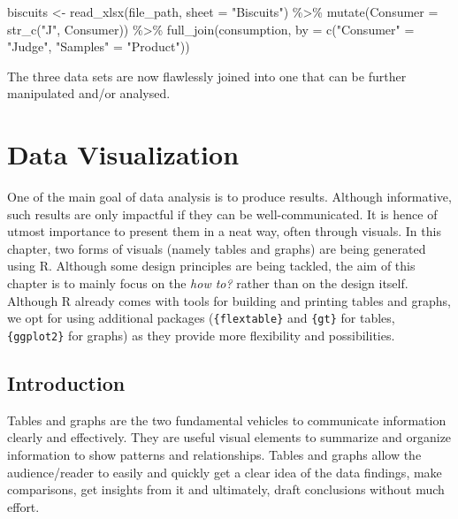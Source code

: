 \documentclass[
]{krantz}
\makeatletter
\newenvironment{Shaded}{\begin{snugshade}}{\end{snugshade}}
\newcommand{\AttributeTok}[1]{\textcolor[rgb]{0.61,0.61,0.61}{#1}}
\newcommand{\FunctionTok}[1]{\textcolor[rgb]{0,0,0}{#1}}
\newcommand{\NormalTok}[1]{#1}
\newcommand{\OtherTok}[1]{\textcolor[rgb]{0.37,0.37,0.37}{#1}}
\newcommand{\SpecialCharTok}[1]{\textcolor[rgb]{0,0,0}{#1}}
\newcommand{\StringTok}[1]{\textcolor[rgb]{0.5,0.5,0.5}{#1}}
\renewenvironment{quote}{\begin{VF}}{\end{VF}}
\newenvironment{kframe}{%
\medskip{}
\setlength{\fboxsep}{.8em}
 \def\at@end@of@kframe{}%
 \ifinner\ifhmode%
  \def\at@end@of@kframe{\end{minipage}}%
  \begin{minipage}{\columnwidth}%
 \fi\fi%
 \def\FrameCommand##1{\hskip\@totalleftmargin \hskip-\fboxsep
 \colorbox{shadecolor}{##1}\hskip-\fboxsep
     \hskip-\linewidth \hskip-\@totalleftmargin \hskip\columnwidth}%
 \MakeFramed {\advance\hsize-\width
   \@totalleftmargin\z@ \linewidth\hsize
   \@setminipage}}%
 {\par\unskip\endMakeFramed%
 \at@end@of@kframe}
\renewenvironment{Shaded}{\begin{kframe}}{\end{kframe}}
\makeatother
\begin{document}
\begin{Shaded}
\begin{Highlighting}[]
\NormalTok{biscuits }\OtherTok{\textless{}{-}} \FunctionTok{read\_xlsx}\NormalTok{(file\_path, }\AttributeTok{sheet =} \StringTok{"Biscuits"}\NormalTok{) }\SpecialCharTok{\%\textgreater{}\%}
   \FunctionTok{mutate}\NormalTok{(}\AttributeTok{Consumer =} \FunctionTok{str\_c}\NormalTok{(}\StringTok{"J"}\NormalTok{, Consumer)) }\SpecialCharTok{\%\textgreater{}\%}
   \FunctionTok{full\_join}\NormalTok{(consumption, }
             \AttributeTok{by =} \FunctionTok{c}\NormalTok{(}\StringTok{"Consumer"} \OtherTok{=} \StringTok{"Judge"}\NormalTok{, }\StringTok{"Samples"} \OtherTok{=} \StringTok{"Product"}\NormalTok{))}
\end{Highlighting}
\end{Shaded}

The three data sets are now flawlessly joined into one that can be further manipulated and/or analysed.

\hypertarget{data-viz}{%
\chapter{Data Visualization}\label{data-viz}}

\begin{quote}
One of the main goal of data analysis is to produce results. Although informative, such results are only impactful if they can be well-communicated. It is hence of utmost importance to present them in a neat way, often through visuals.
In this chapter, two forms of visuals (namely tables and graphs) are being generated using R. Although some design principles are being tackled, the aim of this chapter is to mainly focus on the \emph{how to?} rather than on the design itself.
Although R already comes with tools for building and printing tables and graphs, we opt for using additional packages (\texttt{\{flextable\}} and \texttt{\{gt\}} for tables, \texttt{\{ggplot2\}} for graphs) as they provide more flexibility and possibilities.
\end{quote}

\hypertarget{introduction}{%
\section{Introduction}\label{introduction}}

Tables and graphs are the two fundamental vehicles to communicate information clearly and effectively. They are useful visual elements to summarize and organize information to show patterns and relationships. Tables and graphs allow the audience/reader to easily and quickly get a clear idea of the data findings, make comparisons, get insights from it and ultimately, draft conclusions without much effort.
\end{document}
